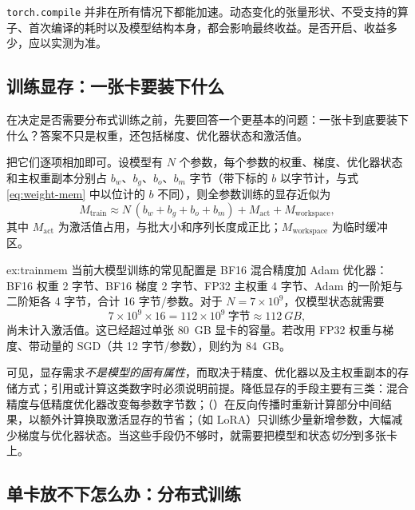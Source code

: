 \begin{pitfall}
\texttt{torch.compile} 并非在所有情况下都能加速。动态变化的张量形状、不受支持的算子、首次编译的耗时以及模型结构本身，都会影响最终收益。是否开启、收益多少，应以实测为准。
\end{pitfall}

\subsection{训练显存：一张卡要装下什么}
\label{subsec:train-mem}

在决定是否需要分布式训练之前，先要回答一个更基本的问题：一张卡到底要装下什么？答案不只是权重，还包括梯度、优化器状态和激活值。

把它们逐项相加即可。设模型有 $N$ 个参数，每个参数的权重、梯度、优化器状态和主权重副本分别占 $b_w$、$b_g$、$b_o$、$b_m$ 字节（带下标的 $b$ 以字节计，与式\,\eqref{eq:weight-mem} 中以位计的 $b$ 不同），则全参数训练的显存近似为
\begin{equation}
  M_{\mathrm{train}} \approx N\,(b_w+b_g+b_o+b_m) + M_{\mathrm{act}} + M_{\mathrm{workspace}},
  \label{eq:train-mem}
\end{equation}
其中 $M_{\mathrm{act}}$ 为激活值占用，与批大小和序列长度成正比；$M_{\mathrm{workspace}}$ 为临时缓冲区。

\begin{example}[7B 模型的训练显存]{ex:trainmem}
当前大模型训练的常见配置是 BF16 混合精度加 Adam 优化器\cite{rajbhandari2020zero}：BF16 权重 2 字节、BF16 梯度 2 字节、FP32 主权重 4 字节、Adam 的一阶矩与二阶矩各 4 字节，合计 16 字节/参数。对于 $N=7\times10^9$，仅模型状态就需要
\[
  7\times10^{9}\times16 = 112\times10^{9}\ \text{字节} \approx \SI{112}{GB},
\]
尚未计入激活值。这已经超过单张 \SI{80}{GB} 显卡的容量。若改用 FP32 权重与梯度、带动量的 SGD（共 12 字节/参数），则约为 \SI{84}{GB}。
\end{example}

可见，显存需求\emph{不是模型的固有属性}，而取决于精度、优化器以及主权重副本的存储方式；引用或计算这类数字时必须说明前提。降低显存的手段主要有三类：混合精度与低精度优化器改变每参数字节数；（）在反向传播时重新计算部分中间结果，以额外计算换取激活显存的节省；（如 LoRA\cite{hu2021lora}）只训练少量新增参数，大幅减少梯度与优化器状态。当这些手段仍不够时，就需要把模型和状态\emph{切分}到多张卡上。

\subsection{单卡放不下怎么办：分布式训练}
\label{subsec:parallel}

